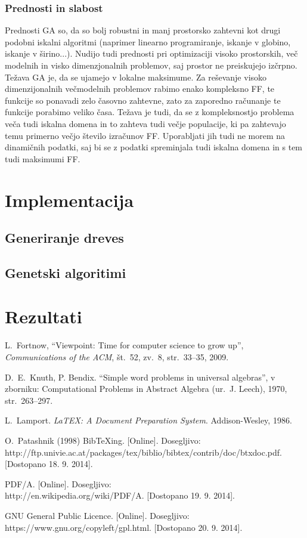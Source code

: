 \documentclass[a4paper, 12pt]{book}
\newcommand{\BibTeX}{{\sc Bib}\TeX}
\begin{document}
\subsection{Prednosti in slabost}
Prednosti GA so, da so bolj robustni in manj prostorsko zahtevni kot drugi podobni iskalni algoritmi (naprimer linearno programiranje, iskanje v globino, iskanje v širino...). Nudijo tudi prednosti pri optimizaciji visoko prostorskih, več modelnih in visko dimenzjonalnih problemov, saj prostor ne preiskujejo izčrpno. Težava GA je, da se ujamejo v lokalne maksimume. Za reševanje visoko dimenzijonalnih večmodelnih problemov rabimo enako kompleksno FF, te funkcije so ponavadi zelo časovno zahtevne, zato za zaporedno računanje te funkcije porabimo veliko časa. Težava je tudi, da se z kompleksnostjo problema veča tudi iskalna domena in to zahteva tudi večje populacije, ki pa zahtevajo temu primerno večjo število izračunov FF. Uporabljati jih tudi ne morem na dinamičnih podatki, saj bi se z podatki spreminjala tudi iskalna domena in s tem tudi maksimumi FF.
\chapter{Implementacija}
\section{Generiranje dreves}
\section{Genetski algoritimi}
\chapter{Rezultati}
\begin{thebibliography}{99}
 L.\ Fortnow, ``Viewpoint: Time for computer science to grow up'',
{\it Communications of the ACM}, št.\ 52, zv.\ 8, str.\ 33--35, 2009.

 D.\ E.\ Knuth, P. Bendix. ``Simple word problems in universal algebras'', v zborniku: Computational Problems in Abstract Algebra (ur.\ J. Leech), 1970, str.\ 263--297.

 L.\ Lamport. \textit{LaTEX: A Document Preparation System}. Addison-Wesley, 1986.

 O.\ Patashnik (1998) \BibTeX{}ing.
[Online]. Dosegljivo:\\ http://ftp.univie.ac.at/packages/tex/biblio/bibtex/contrib/doc/btxdoc.pdf. [Dostopano 18. 9. 2014].

PDF/A.
[Online]. Dosegljivo:\\ http://en.wikipedia.org/wiki/PDF/A. [Dostopano 19. 9. 2014].

 GNU General Public Licence. [Online]. Dosegljivo:\\ https://www.gnu.org/copyleft/gpl.html. [Dostopano 20. 9. 2014].
\end{thebibliography}
\end{document}
